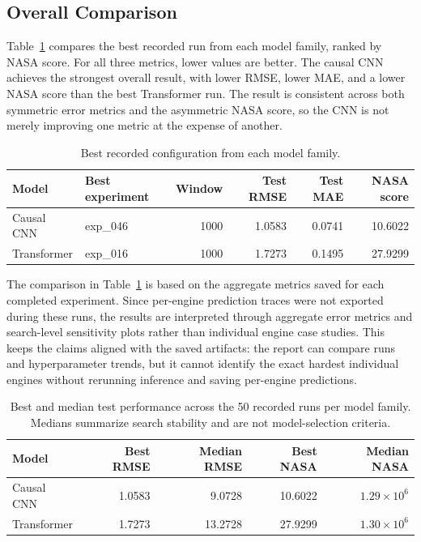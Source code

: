\documentclass[11pt,a4paper]{article}
\begin{document}
\subsection{Overall Comparison}

Table~\ref{tab:best_model_comparison} compares the best recorded run from each model family, ranked by NASA score. For all three metrics, lower values are better. The causal CNN achieves the strongest overall result, with lower RMSE, lower MAE, and a lower NASA score than the best Transformer run. The result is consistent across both symmetric error metrics and the asymmetric NASA score, so the CNN is not merely improving one metric at the expense of another.

\begin{table}[htbp]
\centering
\caption{Best recorded configuration from each model family.}
\label{tab:best_model_comparison}
\begin{tabular}{llrrrr}
\toprule
\textbf{Model} & \textbf{Best experiment} & \textbf{Window} & \textbf{Test RMSE} & \textbf{Test MAE} & \textbf{NASA score} \\
\midrule
Causal CNN & exp\_046 & 1000 & 1.0583 & 0.0741 & 10.6022 \\
Transformer & exp\_016 & 1000 & 1.7273 & 0.1495 & 27.9299 \\
\bottomrule
\end{tabular}
\end{table}

The comparison in Table~\ref{tab:best_model_comparison} is based on the aggregate metrics saved for each completed experiment. Since per-engine prediction traces were not exported during these runs, the results are interpreted through aggregate error metrics and search-level sensitivity plots rather than individual engine case studies. This keeps the claims aligned with the saved artifacts: the report can compare runs and hyperparameter trends, but it cannot identify the exact hardest individual engines without rerunning inference and saving per-engine predictions.

\begin{table}[htbp]
\centering
\caption{Best and median test performance across the 50 recorded runs per model family. Medians summarize search stability and are not model-selection criteria.}
\label{tab:best_median_summary}
\begin{tabular}{lrrrr}
\toprule
\textbf{Model} & \textbf{Best RMSE} & \textbf{Median RMSE} & \textbf{Best NASA} & \textbf{Median NASA} \\
\midrule
Causal CNN & 1.0583 & 9.0728 & 10.6022 & $1.29\times10^{6}$ \\
Transformer & 1.7273 & 13.2728 & 27.9299 & $1.30\times10^{6}$ \\
\bottomrule
\end{tabular}
\end{table}
\end{document}
